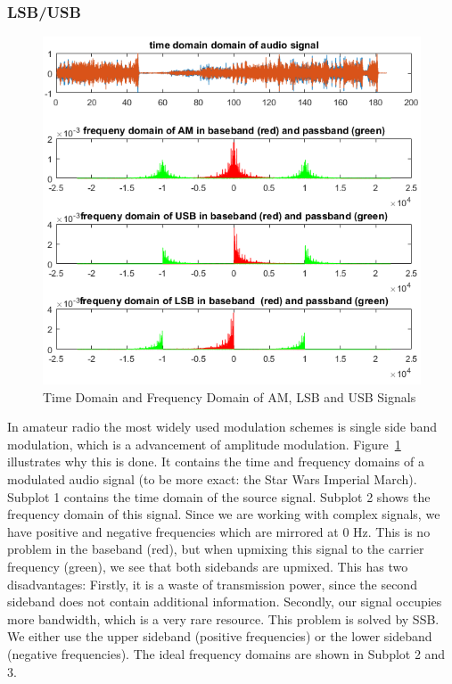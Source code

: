 \subsubsection{LSB/USB}
\label{subsubsec:lsbusb}
\begin{figure}
	\centering
	\includegraphics[width=1.3\linewidth]{gfx/ssb_plots.png}
	\caption{Time Domain and Frequency Domain of AM, LSB and USB Signals}
	\label{fig:impl:f3ssb}
\end{figure}


In amateur radio the most widely used modulation schemes is single side band modulation, which is a advancement of amplitude modulation. Figure~\ref{fig:impl:f3ssb} illustrates why this is done. It contains the time and frequency domains of a modulated audio signal (to be more exact: the Star Wars Imperial March). Subplot 1 contains the time domain of the source signal. Subplot 2 shows the frequency domain of this signal. Since we are working with complex signals, we have positive and negative frequencies which are mirrored at 0 Hz. This is no problem in the baseband (red), but when upmixing this signal to the carrier frequency (green), we see that both sidebands are upmixed. This has two disadvantages: Firstly, it is a waste of transmission power, since the second sideband does not contain additional information. Secondly, our signal occupies more bandwidth, which is a very rare resource. 
This problem is solved by SSB. We either use the upper sideband (positive frequencies) or the lower sideband (negative frequencies). The ideal frequency domains are shown in Subplot 2 and 3. 

